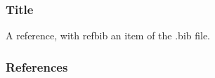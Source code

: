 \documentclass[10pt,handout,english]{beamer}
\begin{document}
\begin{frame}

 \frametitle{Title}
 A reference, with refbib an item of the .bib file.

\end{frame}

\begin{frame}[allowframebreaks]
        \frametitle{References}
%        
\printbibliography
%        
\end{frame}
\end{document}
